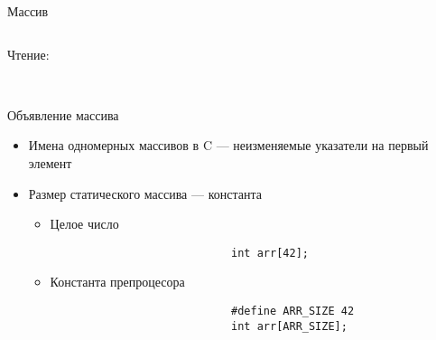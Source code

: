 \documentclass[aspectratio=169,14pt]{beamer}
\begin{document}
\begin{frame}[fragile,t]{Массив}
\begin{onlyenv}
\begin{columns}
\begin{column}{0.5\textwidth}
                    \begin{center}
                        \begin{minipage}{0.9\textwidth}
                            {\color{maincolor}Чтение:} \\
                             \\
                        \end{minipage}
                    \end{center}
                \end{column}
            \end{columns}
        \end{onlyenv}
    \end{frame}

    \begin{frame}[fragile]{Объявление массива}
        \begin{itemize}
            \item<1-> Имена одномерных массивов в C --- неизменяемые указатели на первый элемент
            \item<2-> Размер статического массива --- константа
                \begin{itemize}
                    \item<3-> Целое число
                        \begin{lstlisting}
                            int arr[42];
                        \end{lstlisting}
                    \item<4-> Константа препроцесора
                        \begin{lstlisting}
                            #define ARR_SIZE 42
                            int arr[ARR_SIZE];
                        \end{lstlisting}
                \end{itemize}
        \end{itemize}
    \end{frame}
\end{document}
